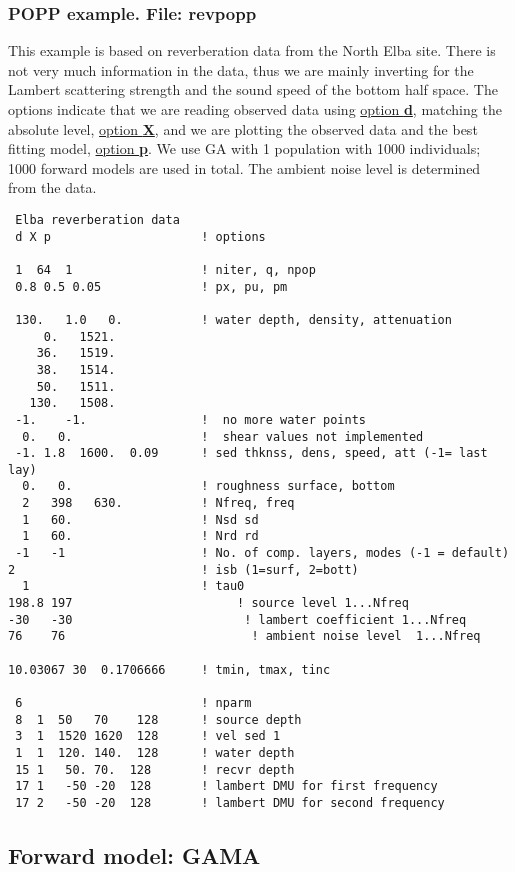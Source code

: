 \documentclass{saclantc}
\begin{document}
\subsubsection{POPP example. File: {\bf revpopp}}
\label{se:revpopp}
This example is based on reverberation data from the North Elba site.
There is not very much information in the data, thus we are mainly 
inverting for the Lambert scattering strength and the sound speed of the
bottom half space. 
The options indicate that  we are reading observed data using
 \underline{option {\bf d}}, 
matching the absolute level, \underline{option {\bf X}}, and we are plotting the observed data and the 
best fitting model, \underline{option {\bf p}}. 
We use GA with 1 population with 1000 individuals; 1000 forward models are
used in total.
The ambient noise level is determined from the data.
\small
\begin{verbatim}
 Elba reverberation data
 d X p                     ! options

 1  64  1                  ! niter, q, npop
 0.8 0.5 0.05              ! px, pu, pm

 130.   1.0   0.           ! water depth, density, attenuation
     0.   1521.
    36.   1519.
    38.   1514.
    50.   1511.
   130.   1508.
 -1.    -1.                !  no more water points
  0.   0.                  !  shear values not implemented
 -1. 1.8  1600.  0.09      ! sed thknss, dens, speed, att (-1= last lay)
  0.   0.                  ! roughness surface, bottom
  2   398   630.           ! Nfreq, freq
  1   60.                  ! Nsd sd
  1   60.                  ! Nrd rd
 -1   -1                   ! No. of comp. layers, modes (-1 = default)
2                          ! isb (1=surf, 2=bott)
  1                        ! tau0
198.8 197                       ! source level 1...Nfreq
-30   -30                        ! lambert coefficient 1...Nfreq
76    76                          ! ambient noise level  1...Nfreq

10.03067 30  0.1706666     ! tmin, tmax, tinc

 6                         ! nparm
 8  1  50   70    128      ! source depth
 3  1  1520 1620  128      ! vel sed 1
 1  1  120. 140.  128      ! water depth
 15 1   50. 70.  128       ! recvr depth
 17 1   -50 -20  128       ! lambert DMU for first frequency
 17 2   -50 -20  128       ! lambert DMU for second frequency
\end{verbatim}
\normalsize

\subsection{Forward model: GAMA }
\label{se:gama}
\end{document}

